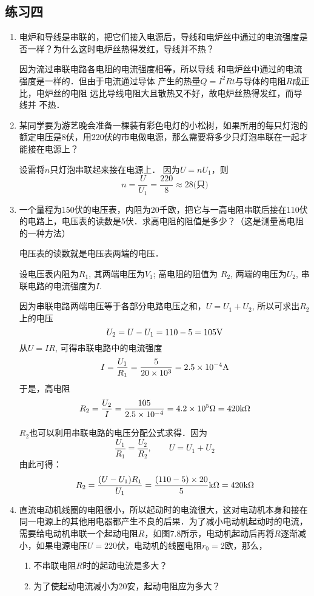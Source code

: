 \subsection{练习四}
\begin{enumerate}
    \item 电炉和导线是串联的，把它们接入电源后，导线和电炉丝中通过的电流强度是否一样？为什么这时电炉丝热得发红，导线并不热？

    \begin{solution}
因为流过串联电路各电阻的电流强度相等，所以导线
和电炉丝中通过的电流强度是一样的．但由于电流通过导体
产生的热量$Q=I^2Rt$与导体的电阻$R$成正比，电炉丝的电阻
远比导线电阻大且散热又不好，故电炉丝热得发红，而导线并
不热．    
    \end{solution}
    \item 某同学要为游艺晚会准备一棵装有彩色电灯的小松树，如果所用的每只灯泡的额定电压是8伏，用220伏的市电做电源，那么需要将多少只灯泡串联在一起才能接在电源上？

    \begin{solution}
 设需将$n$只灯泡串联起来接在电源上．
因为$U=nU_1$，则
\[n=\frac{U}{U_1}=\frac{220}{8}\approx 28\text{(只)}\]   
    \end{solution}
    \item 一个量程为150伏的电压表，内阻为20千欧，把它与一高电阻串联后接在110伏的电路上，电压表的读数是5伏．求高电阻的阻值是多少？（这是测量高电阻的一种方法）

    \begin{solution}
电压表的读数就是电压表两端的电压．

设电压表内阻为$R_1$, 其两端电压为$V_1$; 高电阻的阻值为
$R_2$, 两端的电压为$U_2$, 串联电路的电流强度为$I$.

因为串联电路两端电压等于各部分电路电压之和，$U=
U_1+U_2$, 所以可求出$R_2$上的电压
\[U_2=U-U_1=110-5=105{\rm V}\]
从$U=IR$, 可得串联电路中的电流强度
\[I=\frac{U_1}{R_1}=\frac{5}{20\times10^3}=2.5\times 10^{-4}{\rm A}\]
于是，高电阻
    \[R_2=\frac{U_2}{I}=\frac{105}{2.5\times 10^{-4}}=4.2\times 10^{5}\Omega=420{\rm k}\Omega\]

    $R_2$也可以利用串联电路的电压分配公式求得．因为
\[\frac{U_1}{R_1}=\frac{U_2}{R_2},\qquad U=U_1+U_2\]
由此可得：
\[R_2=\frac{(U-U_1)R_1}{U_1}=\frac{(110-5)\times 20}{5}{\rm k}\Omega=420{\rm k}\Omega\]
    \end{solution}
    \item 直流电动机线圈的电阻很小，所以起动时的电流很大，这对电动机本身和接在同一电源上的其他用电器都产生不良的后果．为了减小电动机起动时的电流，需要给电动机串联一个起动电阻$R$，如图7.8所示，电动机起动后再将$R$逐渐减小，如果电源电压$U=220$伏，电动机的线圈电阻$r_0=2$欧，那么，
    \begin{enumerate}
        \item 不串联电阻$R$时的起动电流是多大？
        \item 为了使起动电流减小为20安，起动电阻应为多大？
    \end{enumerate}


\end{enumerate}
